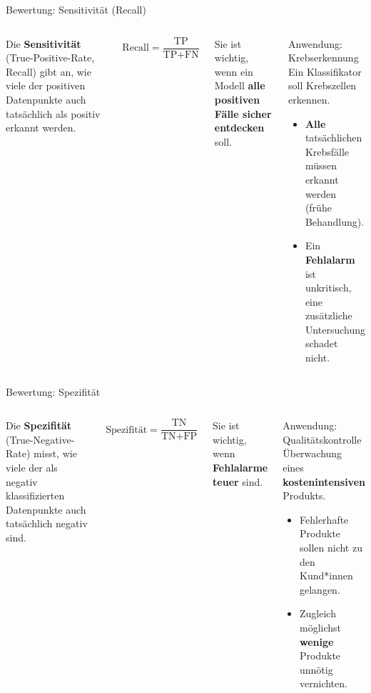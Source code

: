 \begin{frame}{Bewertung: Sensitivität (Recall)}
\begin{columns}
Die \textbf{Sensitivität} (True-Positive-Rate, Recall) gibt an, wie viele
der positiven Datenpunkte auch tatsächlich als positiv erkannt werden.

\vspace{0.4em}
\[
  \text{Recall} = \frac{\text{TP}}{\text{TP} + \text{FN}}
\]

\vspace{0.4em}
Sie ist wichtig, wenn ein Modell \textbf{alle positiven Fälle sicher
entdecken} soll.

\begin{blockC1}{Anwendung: Krebserkennung}
Ein Klassifikator soll Krebszellen erkennen.
\begin{itemize}
  \item \textbf{Alle} tatsächlichen Krebsfälle müssen erkannt werden
        (frühe Behandlung).
  \item Ein \textbf{Fehlalarm} ist unkritisch, eine zusätzliche
        Untersuchung schadet nicht.
\end{itemize}
\end{blockC1}
\end{columns}
\end{frame}


\begin{frame}{Bewertung: Spezifität}
\begin{columns}
Die \textbf{Spezifität} (True-Negative-Rate) misst, wie viele der als
negativ klassifizierten Datenpunkte auch tatsächlich negativ sind.

\vspace{0.4em}
\[
  \text{Spezifität} = \frac{\text{TN}}{\text{TN} + \text{FP}}
\]

\vspace{0.4em}
Sie ist wichtig, wenn \textbf{Fehlalarme teuer} sind.

\begin{blockC1}{Anwendung: Qualitätskontrolle}
Überwachung eines \textbf{kostenintensiven} Produkts.
\begin{itemize}
  \item Fehlerhafte Produkte sollen nicht zu den Kund*innen gelangen.
  \item Zugleich möglichst \textbf{wenige} Produkte unnötig vernichten.
\end{itemize}
\end{blockC1}
\end{columns}
\end{frame}

